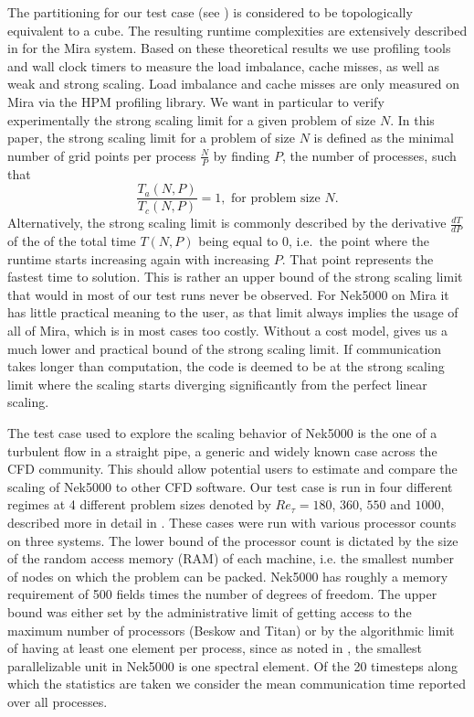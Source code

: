 \documentclass{sig-alternate}
\begin{document}
The partitioning for our test case (see ) is considered to be
topologically equivalent to a cube. The resulting runtime complexities are
extensively described in \cite{fischer:scaling} for the Mira system. Based on
these theoretical results we use profiling tools and wall clock timers to
measure the load imbalance,
cache misses, as well as weak and strong scaling. Load imbalance and cache
misses are only measured on Mira via the HPM profiling library. 
We want in particular to verify
experimentally the strong scaling limit for a given problem of size $N$. 
In this paper, the strong scaling limit for a problem of size $N$ is defined
as the minimal number of grid points per process $\frac{N}{P}$ by finding $P$,
the number of processes, such that
\begin{equation}
  \dfrac{T_a(N,P)}{T_c(N,P)}=1,\mbox{ for problem size }N.
  \label{eq:strong}
\end{equation} 
\noindent Alternatively, the strong scaling limit is commonly described by the
derivative $\frac{dT}{dP}$ of the
of the total time $T(N,P)$ being equal to $0$, i.e.\ the point where the runtime
starts increasing again with increasing $P$. That point represents the fastest
time to solution. This is rather an upper bound of the strong scaling
limit that would in most of our test runs never be observed. For Nek5000 on Mira it has
little practical meaning to the user, as that limit always implies the usage
of all of Mira, which is in most cases too costly. Without a cost model, 
 gives us a much lower and practical bound of the strong
scaling limit. If communication takes longer than
computation, the code is deemed to be at the strong scaling limit where the
scaling starts diverging significantly from the perfect linear scaling. 

The test case used to explore the scaling behavior of Nek5000 is the one of a turbulent 
flow in a straight pipe, a generic and widely known case across the CFD community.
This should allow potential users to estimate and compare the scaling of Nek5000 to other CFD software.
Our test case is run in four different regimes at 4 different problem sizes denoted by
$Re_{\tau} = 180$, $360$, $550$ and $1000$, described more in
detail in . These cases were run with various processor counts 
on three systems. The lower bound of the processor count is dictated by the size 
of the random access memory (RAM) of each machine, i.e. the smallest number of 
nodes on which the problem can be packed. Nek5000 has roughly a memory requirement of 500 fields 
times the number of degrees of freedom. The upper bound was either set by the
administrative limit of getting access to the maximum number of processors
(Beskow and Titan) or by the algorithmic limit of having at least one element 
per process, since as noted in , the smallest parallelizable 
unit in Nek5000 is one spectral element. Of the 20 timesteps along which the
statistics are taken we consider the mean communication time reported over all
processes. 
\end{document}
